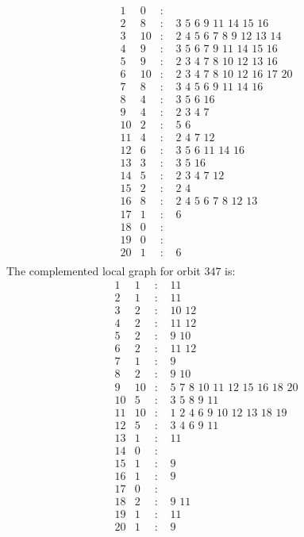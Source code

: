 \documentclass[12pt]{article}
\begin{document}
\begin{equation*}
\begin{array}{rrcl}
1&0&:&\\
2&8&:&\,\,3\,\,5\,\,6\,\,9\,\,11\,\,14\,\,15\,\,16\\
3&10&:&\,\,2\,\,4\,\,5\,\,6\,\,7\,\,8\,\,9\,\,12\,\,13\,\,14\\
4&9&:&\,\,3\,\,5\,\,6\,\,7\,\,9\,\,11\,\,14\,\,15\,\,16\\
5&9&:&\,\,2\,\,3\,\,4\,\,7\,\,8\,\,10\,\,12\,\,13\,\,16\\
6&10&:&\,\,2\,\,3\,\,4\,\,7\,\,8\,\,10\,\,12\,\,16\,\,17\,\,20\\
7&8&:&\,\,3\,\,4\,\,5\,\,6\,\,9\,\,11\,\,14\,\,16\\
8&4&:&\,\,3\,\,5\,\,6\,\,16\\
9&4&:&\,\,2\,\,3\,\,4\,\,7\\
10&2&:&\,\,5\,\,6\\
11&4&:&\,\,2\,\,4\,\,7\,\,12\\
12&6&:&\,\,3\,\,5\,\,6\,\,11\,\,14\,\,16\\
13&3&:&\,\,3\,\,5\,\,16\\
14&5&:&\,\,2\,\,3\,\,4\,\,7\,\,12\\
15&2&:&\,\,2\,\,4\\
16&8&:&\,\,2\,\,4\,\,5\,\,6\,\,7\,\,8\,\,12\,\,13\\
17&1&:&\,\,6\\
18&0&:&\\
19&0&:&\\
20&1&:&\,\,6\\
\end{array}
\end{equation*}
The complemented local graph for orbit $347$ is:
\begin{equation*}
\begin{array}{rrcl}
1&1&:&\,\,11\\
2&1&:&\,\,11\\
3&2&:&\,\,10\,\,12\\
4&2&:&\,\,11\,\,12\\
5&2&:&\,\,9\,\,10\\
6&2&:&\,\,11\,\,12\\
7&1&:&\,\,9\\
8&2&:&\,\,9\,\,10\\
9&10&:&\,\,5\,\,7\,\,8\,\,10\,\,11\,\,12\,\,15\,\,16\,\,18\,\,20\\
10&5&:&\,\,3\,\,5\,\,8\,\,9\,\,11\\
11&10&:&\,\,1\,\,2\,\,4\,\,6\,\,9\,\,10\,\,12\,\,13\,\,18\,\,19\\
12&5&:&\,\,3\,\,4\,\,6\,\,9\,\,11\\
13&1&:&\,\,11\\
14&0&:&\\
15&1&:&\,\,9\\
16&1&:&\,\,9\\
17&0&:&\\
18&2&:&\,\,9\,\,11\\
19&1&:&\,\,11\\
20&1&:&\,\,9\\
\end{array}
\end{equation*}
\end{document}
